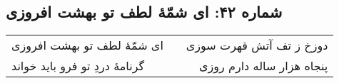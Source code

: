 \begin{center}
\section*{شماره ۴۲: ای شمّۀ لطف تو بهشت افروزی}
\label{sec:042}
\begin{longtable}{l p{0.5cm} r}
ای شمّهٔ لطف تو بهشت افروزی
&&
دوزخ ز تف آتش قهرت سوزی
\\
گرنامهٔ دردِ تو فرو باید خواند
&&
پنجاه هزار ساله دارم روزی
\\
\end{longtable}
\end{center}

